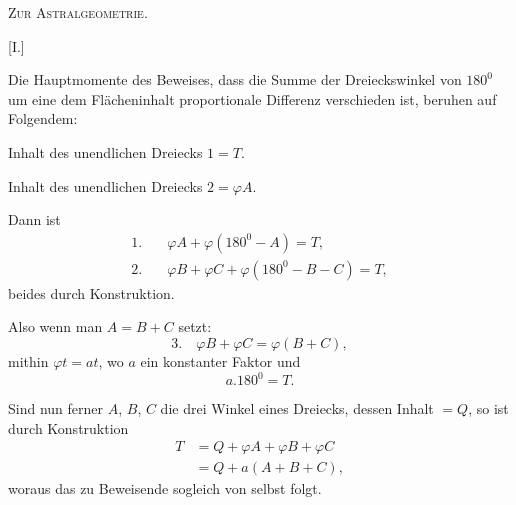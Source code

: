 \clearpage
{}%
\begin{center}\Large\textsc{Zur Astralgeometrie.}\end{center}
\bigskip
\begin{center}[I.]\end{center}
Die Hauptmomente des Beweises, dass die Summe der Dreieckswinkel von $180^{0}$ um eine dem Flächeninhalt proportionale Differenz verschieden ist, beruhen auf Folgendem:
\begin{center}\hspace{1em}\end{center}
Inhalt des unendlichen Dreiecks $1=T$.

Inhalt des unendlichen Dreiecks $2=\varphi A$.

Dann ist
\[
\begin{aligned}
1.\quad &\varphi A+\varphi(180^{0}-A)=T,\\
2.\quad &\varphi B+\varphi C+\varphi(180^{0}-B-C)=T,
\end{aligned}
\]
beides durch Konstruktion.

Also wenn man $A=B+C$ setzt:
\[
3.\quad\varphi B+\varphi C=\varphi(B+C),
\]
mithin $\varphi t=at$, wo $a$ ein konstanter Faktor und
\[
a.180^{0}=T.
\]
\begin{center}\end{center}
Sind nun ferner $A$, $B$, $C$ die drei Winkel eines Dreiecks, dessen Inhalt $=Q$, so ist durch Konstruktion
\[
\begin{aligned}
T&=Q+\varphi A+\varphi B+\varphi C\\
&=Q+a(A+B+C),
\end{aligned}
\]
woraus das zu Beweisende sogleich von selbst folgt.

